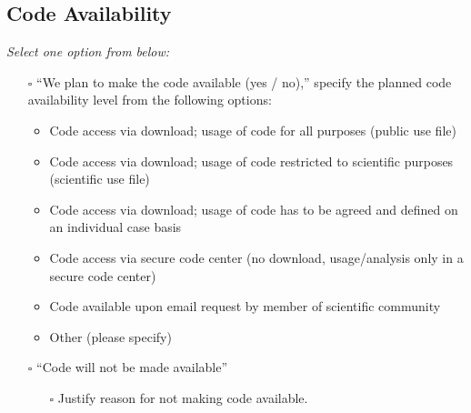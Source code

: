 \documentclass[
]{article}
\providecommand{\tightlist}{%
  \setlength{\itemsep}{0pt}\setlength{\parskip}{0pt}}\usepackage{longtable,booktabs,array}
\begin{document}
\subsection*{Code Availability}\label{code-availability}

\begin{tcolorbox}[enhanced jigsaw, opacityback=0, left=2mm, opacitybacktitle=0.6, breakable, toptitle=1mm, rightrule=.15mm, titlerule=0mm, leftrule=.75mm, title=\textcolor{quarto-callout-caution-color}{\faFire}\hspace{0.5em}{Preregistration Item}, colback=white, arc=.35mm, bottomtitle=1mm, bottomrule=.15mm, colframe=quarto-callout-caution-color-frame, coltitle=black, colbacktitle=quarto-callout-caution-color!10!white, toprule=.15mm]

\emph{Select one option from below:}

\begin{itemize}
\tightlist
\item[$\square$]
  ``We plan to make the code available (yes / no),'' specify the planned
  code availability level from the following options:

  \begin{itemize}
  \tightlist
  \item
    Code access via download; usage of code for all purposes (public use
    file)
  \item
    Code access via download; usage of code restricted to scientific
    purposes (scientific use file)
  \item
    Code access via download; usage of code has to be agreed and defined
    on an individual case basis
  \item
    Code access via secure code center (no download, usage/analysis only
    in a secure code center)
  \item
    Code available upon email request by member of scientific community
  \item
    Other (please specify)
  \end{itemize}
\item[$\square$]
  ``Code will not be made available''

  \begin{itemize}
  \tightlist
  \item[$\square$]
    Justify reason for not making code available.
  \end{itemize}
\end{itemize}

\end{tcolorbox}
\end{document}
